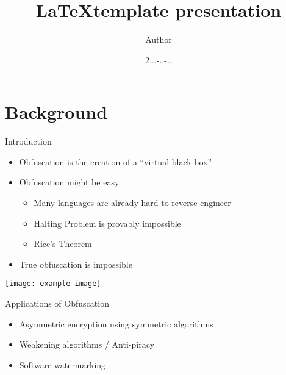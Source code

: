 \documentclass{beamer}
\title{\LaTeX template presentation}
\author{Author}
\date{2...-..-..}
\begin{document}
\maketitle


\section{Background}
\begin{frame}{Introduction}
    \begin{itemize}
        \item{Obfuscation is the creation of a ``virtual black box''}
        \item<2->{Obfuscation might be easy}
        \begin{itemize}
            \item<3->Many languages are already hard to reverse engineer
            \item<4-> Halting Problem is provably impossible
            \item<5-> Rice’s Theorem
        \end{itemize}
        \item<6-> True obfuscation is impossible
    \end{itemize}

    \centering
    \texttt{[image: example-image]}
\end{frame}

\begin{frame}{Applications of Obfuscation}
    \begin{itemize}
    \item<1-> Asymmetric encryption using symmetric algorithms
    \item<4-> Weakening algorithms / Anti-piracy
    \item<5-> Software watermarking
    \end{itemize}

\end{frame}
\end{document}

